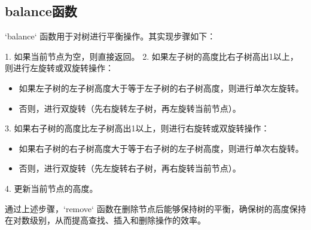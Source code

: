 \documentclass[UTF8]{ctexart}
\begin{document}
\subsection{balance函数}

`balance` 函数用于对树进行平衡操作。其实现步骤如下：

1. 如果当前节点为空，则直接返回。
2. 如果左子树的高度比右子树高出1以上，则进行左旋转或双旋转操作：
   \begin{itemize}
       \item 如果左子树的左子树高度大于等于左子树的右子树高度，则进行单次左旋转。
       \item 否则，进行双旋转（先右旋转左子树，再左旋转当前节点）。
   \end{itemize}
3. 如果右子树的高度比左子树高出1以上，则进行右旋转或双旋转操作：
   \begin{itemize}
       \item 如果右子树的右子树高度大于等于右子树的左子树高度，则进行单次右旋转。
       \item 否则，进行双旋转（先左旋转右子树，再右旋转当前节点）。
   \end{itemize}
4. 更新当前节点的高度。

通过上述步骤，`remove` 函数在删除节点后能够保持树的平衡，确保树的高度保持在对数级别，从而提高查找、插入和删除操作的效率。
\end{document}
